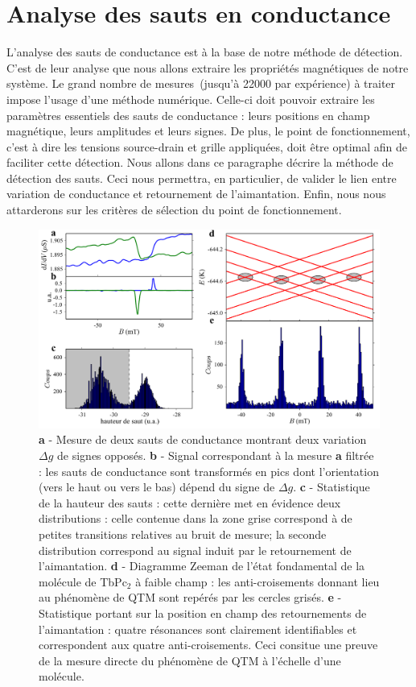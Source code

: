 \section{Analyse des sauts en conductance}
L'analyse des sauts de conductance est à la base de notre méthode de détection. C'est de leur analyse que nous allons extraire les propriétés magnétiques de notre système. Le grand nombre de mesures~(jusqu'à 22000 par expérience) à traiter impose l'usage d'une méthode numérique. Celle-ci doit pouvoir extraire les paramètres essentiels des sauts de conductance : leurs positions en champ magnétique, leurs amplitudes et leurs signes. De plus, le point de fonctionnement, c'est à dire les tensions source-drain et grille appliquées, doit être optimal afin de faciliter cette détection. Nous allons dans ce paragraphe décrire la méthode de détection des sauts. Ceci nous permettra, en particulier, de valider le lien entre variation de conductance et retournement de l'aimantation. Enfin, nous nous attarderons sur les critères de sélection du point de fonctionnement.

\begin{figure}
\includegraphics[scale=0.45]{Resultats/CondJump/CondJump.pdf} 
\caption{\textbf{a} - Mesure de deux sauts de conductance montrant deux variation $\Delta g$ de signes opposés. \textbf{b} - Signal correspondant à la mesure \textbf{a} filtrée : les sauts de conductance sont transformés en pics dont l'orientation (vers le haut ou vers le bas) dépend du signe de $\Delta g$. \textbf{c} - Statistique de la hauteur des sauts : cette dernière met en évidence deux distributions : celle contenue dans la zone grise correspond à de petites transitions relatives au bruit de mesure; la seconde distribution correspond au signal induit par le retournement de l'aimantation. \textbf{d} - Diagramme Zeeman de l'état fondamental de la molécule de TbPc$_2$ à faible champ : les anti-croisements donnant lieu au phénomène de QTM sont repérés par les cercles grisés. \textbf{e} - Statistique portant sur la position en champ des retournements de l'aimantation : quatre résonances sont clairement identifiables et correspondent aux quatre anti-croisements. Ceci consitue une preuve de la mesure directe du phénomène de QTM à l'échelle d'une molécule.}
\label{analyse_saut}
\end{figure}
